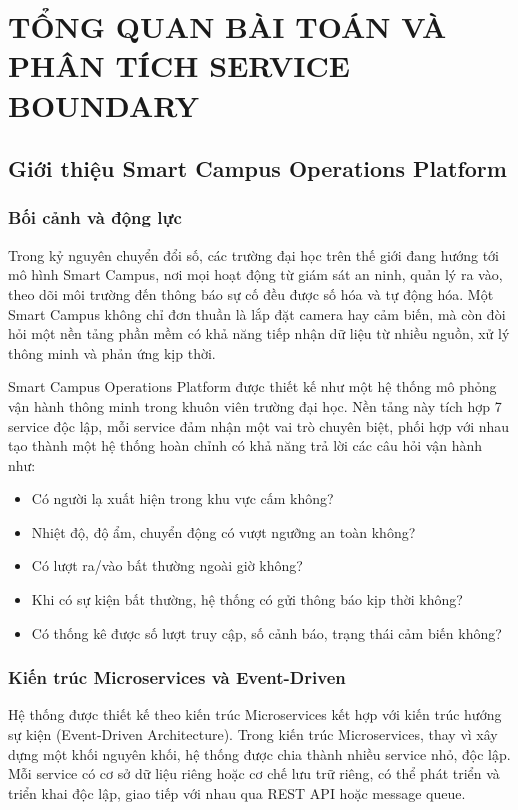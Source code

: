 \chapter{TỔNG QUAN BÀI TOÁN VÀ PHÂN TÍCH SERVICE BOUNDARY}

\section{Giới thiệu Smart Campus Operations Platform}

\subsection{Bối cảnh và động lực}

Trong kỷ nguyên chuyển đổi số, các trường đại học trên thế giới đang hướng tới mô hình Smart Campus, nơi mọi hoạt động từ giám sát an ninh, quản lý ra vào, theo dõi môi trường đến thông báo sự cố đều được số hóa và tự động hóa. Một Smart Campus không chỉ đơn thuần là lắp đặt camera hay cảm biến, mà còn đòi hỏi một nền tảng phần mềm có khả năng tiếp nhận dữ liệu từ nhiều nguồn, xử lý thông minh và phản ứng kịp thời.

Smart Campus Operations Platform được thiết kế như một hệ thống mô phỏng vận hành thông minh trong khuôn viên trường đại học. Nền tảng này tích hợp 7 service độc lập, mỗi service đảm nhận một vai trò chuyên biệt, phối hợp với nhau tạo thành một hệ thống hoàn chỉnh có khả năng trả lời các câu hỏi vận hành như:

\begin{itemize}
    \item Có người lạ xuất hiện trong khu vực cấm không?
    \item Nhiệt độ, độ ẩm, chuyển động có vượt ngưỡng an toàn không?
    \item Có lượt ra/vào bất thường ngoài giờ không?
    \item Khi có sự kiện bất thường, hệ thống có gửi thông báo kịp thời không?
    \item Có thống kê được số lượt truy cập, số cảnh báo, trạng thái cảm biến không?
\end{itemize}

\subsection{Kiến trúc Microservices và Event-Driven}

Hệ thống được thiết kế theo kiến trúc Microservices kết hợp với kiến trúc hướng sự kiện (Event-Driven Architecture). Trong kiến trúc Microservices, thay vì xây dựng một khối nguyên khối, hệ thống được chia thành nhiều service nhỏ, độc lập. Mỗi service có cơ sở dữ liệu riêng hoặc cơ chế lưu trữ riêng, có thể phát triển và triển khai độc lập, giao tiếp với nhau qua REST API hoặc message queue.

